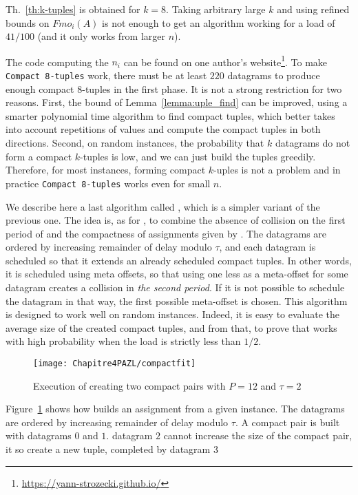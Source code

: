 Th.~\ref{th:k-tuples} is obtained for $k=8$. Taking arbitrary large $k$ and using refined bounds on $Fmo_i(A)$ is not enough to get an algorithm working for a load of $41/100$ (and it only works from larger $n$).

The code computing the $n_i$ can be found on one author's website\footnote{\url{https://yann-strozecki.github.io/}}.
To make \texttt{Compact 8-tuples} work, there must be at least $220$ datagrams to
produce enough compact $8$-tuples in the first phase. It is not a strong restriction for two reasons. First, the bound of Lemma~\ref{lemma:uple_find} can be improved, using a smarter polynomial time algorithm to find compact tuples, which better takes into account repetitions of values and compute the compact tuples in both directions. Second, on random instances, the probability that $k$ datagrams do not form a compact $k$-tuples is low, and we can just build the tuples greedily. Therefore, for most instances, forming compact $k$-uples is not a problem and in practice \texttt{Compact 8-tuples} works even for small $n$.



We describe here a last algorithm called \compactfit, which is a simpler variant of the previous one. The idea is, as for \compactpair, to combine the absence of collision on the first period of \metaoffset and the compactness of assignments given by \firstfit.
The datagrams are ordered by increasing remainder of delay modulo $\tau$, and each datagram is scheduled so that 
it extends an already scheduled compact tuples. In other words, it is scheduled using meta offsets, so that using one less as a meta-offset for some datagram creates a collision in \emph{the second period}. If it is not possible to schedule the datagram in that way, the first possible meta-offset is chosen. This algorithm is designed to work well on random instances. Indeed, it 
is easy to evaluate the average size of the created compact tuples, and from that, to prove that \compactfit works with high probability when the load is strictly less than $1/2$.
\begin{figure}[h]
 \begin{center}
\texttt{[image: Chapitre4PAZL/compactfit]}
\end{center}
\caption{Execution of \compactfit creating two compact pairs with $P=12$ and $\tau =2$}
\label{fig:compactfit}
\end{figure}
Figure~\ref{fig:compactfit} shows how \compactfit builds an assignment from a given instance. The datagrams are ordered by increasing remainder of delay modulo $\tau$. A compact pair is built with datagrams $0$ and $1$. datagram $2$ cannot increase the size of the compact pair, it so create a new tuple, completed by datagram $3$



